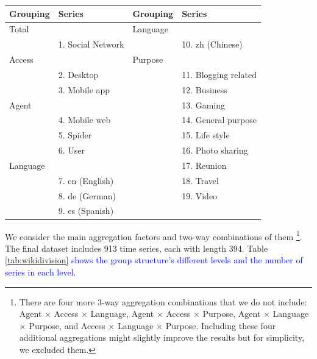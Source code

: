 \documentclass[11pt,a4paper,]{article}
\let\origtable\table
\let\endorigtable\endtable
\renewenvironment{table}[1][2] {
    \expandafter\origtable\expandafter[!htbp]
} {
    \endorigtable
}
\begin{document}
\begin{table}

\caption{\label{tab:wikipediagroupingstructure}Social networking Wikipedia article grouping structure}
\centering
\begin{tabular}[t]{llll}
\toprule
Grouping & Series & Grouping & Series\\
\midrule
Total &  & Language & \\
 & 1. Social Network &  & 10. zh (Chinese)\\
Access &  & Purpose & \\
 & 2. Desktop &  & 11. Blogging related\\
 & 3. Mobile app &  & 12. Business\\
Agent &  &  & 13. Gaming\\
 & 4.  Mobile web &  & 14. General purpose\\
 & 5. Spider &  & 15. Life style\\
 & 6. User &  & 16. Photo sharing\\
Language &  &  & 17. Reunion\\
 & 7. en (English) &  & 18. Travel\\
 & 8. de (German) &  & 19. Video\\
 & 9. es (Spanish) &  & \\
\bottomrule
\end{tabular}
\end{table}

We consider the main aggregation factors and two-way combinations of them \footnote{There are four more 3-way aggregation combinations that we do not include: Agent \(\times\) Access \(\times\) Language, Agent \(\times\) Access \(\times\) Purpose, Agent \(\times\) Language \(\times\) Purpose, and Access \(\times\) Language \(\times\) Purpose. Including these four additional aggregations might slightly improve the results but for simplicity, we excluded them.}. The final dataset includes 913 time series, each with length 394. Table \ref{tab:wikidivision} \textcolor{blue}{shows the group structure’s different levels and the number of series in each level.}
\end{document}
